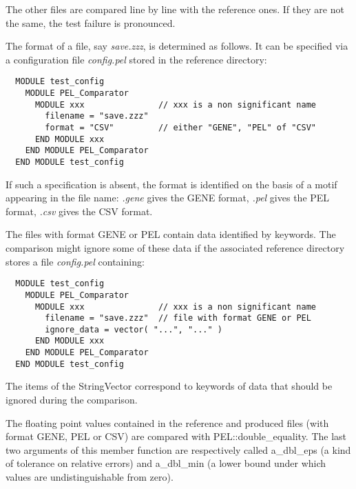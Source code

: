 \documentclass{article}
\begin{document}
\begin{description}
The other files are compared line by line with the reference ones.
If they are not the same, the test failure is pronounced.


\item[.] \mbox{}

The format of a file, say \emph{save.zzz}, is determined as follows.
It can be specified via a configuration file \emph{config.pel} stored
in the reference directory:

\begin{verbatim}
  MODULE test_config
    MODULE PEL_Comparator
      MODULE xxx               // xxx is a non significant name
        filename = "save.zzz"
        format = "CSV"         // either "GENE", "PEL" of "CSV"
      END MODULE xxx
    END MODULE PEL_Comparator
  END MODULE test_config
\end{verbatim}


If such a specification is absent, the format is identified on the
basis of a motif appearing in the file name: \emph{.gene} gives the GENE
format, \emph{.pel} gives the PEL format, \emph{.csv} gives the CSV format.


\item[.] \mbox{}

The files with format GENE or PEL contain data identified by keywords.
The comparison might ignore some of these data if the associated
reference directory stores a file \emph{config.pel}
containing:

\begin{verbatim}
  MODULE test_config
    MODULE PEL_Comparator
      MODULE xxx               // xxx is a non significant name
        filename = "save.zzz"  // file with format GENE or PEL
        ignore_data = vector( "...", "..." )
      END MODULE xxx
    END MODULE PEL_Comparator
  END MODULE test_config
\end{verbatim}


The items of the StringVector correspond to keywords of data that
should be ignored during the comparison.


\item[.] \mbox{}

The floating point values contained in the reference and produced files
(with format GENE, PEL or CSV) are compared with PEL::double\_equality.
The last two arguments of
this member function are respectively called a\_dbl\_eps (a
kind of tolerance on relative errors) and a\_dbl\_min (a lower bound under which
values are undistinguishable from zero).




\end{description}
\end{document}
